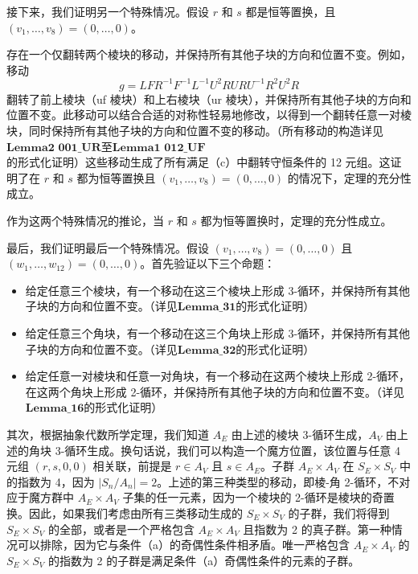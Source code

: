 \documentclass{article}
\begin{document}
接下来，我们证明另一个特殊情况。假设 \( r \) 和 \( s \) 都是恒等置换，且 \( (v_1, \dots, v_8) = (0, \dots, 0) \)。

存在一个仅翻转两个棱块的移动，并保持所有其他子块的方向和位置不变。例如，移动
\[
g = L F R^{-1} F^{-1} L^{-1} U^2 R U R U^{-1} R^2 U^2 R
\]
翻转了前上棱块（uf 棱块）和上右棱块（ur 棱块），并保持所有其他子块的方向和位置不变。此移动可以结合合适的对称性轻易地修改，以得到一个翻转任意一对棱块，同时保持所有其他子块的方向和位置不变的移动。（所有移动的构造详见$\mathbf{Lemma2}\,\,\mathbf{001}\_\mathbf{UR}$至$\mathbf{Lemma1}\,\,\mathbf{012}\_\mathbf{UF}$\\的形式化证明）这些移动生成了所有满足（c）中翻转守恒条件的 12 元组。这证明了在 \( r \) 和 \( s \) 都为恒等置换且 \( (v_1, \dots, v_8) = (0, \dots, 0) \) 的情况下，定理的充分性成立。

作为这两个特殊情况的推论，当 \( r \) 和 \( s \) 都为恒等置换时，定理的充分性成立。

最后，我们证明最后一个特殊情况。假设 \( (v_1, \dots, v_8) = (0, \dots, 0) \) 且 \( (w_1, \dots, w_{12}) = (0, \dots, 0) \)。首先验证以下三个命题：

\begin{itemize}
    \item 给定任意三个棱块，有一个移动在这三个棱块上形成 3-循环，并保持所有其他子块的方向和位置不变。（详见$\mathbf{Lemma}\_\mathbf{31}$的形式化证明）
    \item 给定任意三个角块，有一个移动在这三个角块上形成 3-循环，并保持所有其他子块的方向和位置不变。（详见$\mathbf{Lemma}\_\mathbf{32}$的形式化证明）
    \item 给定任意一对棱块和任意一对角块，有一个移动在这两个棱块上形成 2-循环，在这两个角块上形成 2-循环，并保持所有其他子块的方向和位置不变。（详见$\mathbf{Lemma}\_\mathbf{16}$的形式化证明）
\end{itemize}



其次，根据抽象代数所学定理，我们知道 \( A_E \) 由上述的棱块 3-循环生成，\( A_V \) 由上述的角块 3-循环生成。换句话说，我们可以构造一个魔方位置，该位置与任意 4 元组 \( (r, s, 0, 0) \) 相关联，前提是 \( r \in A_V \) 且 \( s \in A_E \)。子群 \( A_E \times A_V \) 在 \( S_E \times S_V \) 中的指数为 4，因为 \( |S_n / A_n| = 2 \)。上述的第三种类型的移动，即棱-角 2-循环，不对应于魔方群中 \( A_E \times A_V \) 子集的任一元素，因为一个棱块的 2-循环是棱块的奇置换。因此，如果我们考虑由所有三类移动生成的 \( S_E \times S_V \) 的子群，我们将得到 \( S_E \times S_V \) 的全部，或者是一个严格包含 \( A_E \times A_V \) 且指数为 2 的真子群。第一种情况可以排除，因为它与条件（a）的奇偶性条件相矛盾。唯一严格包含 \( A_E \times A_V \) 的 \( S_E \times S_V \) 的指数为 2 的子群是满足条件（a）奇偶性条件的元素的子群。
\end{document}
